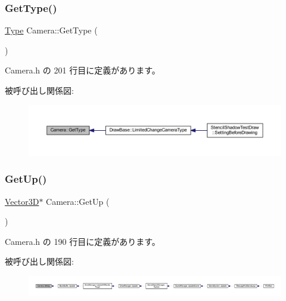 \subsubsection{\texorpdfstring{Get\+Type()}{GetType()}}
{\footnotesize\ttfamily \mbox{\hyperlink{class_camera_a3b0a1f58deca679ac665f61c480d1dcb}{Type}} Camera\+::\+Get\+Type (\begin{DoxyParamCaption}{ }\end{DoxyParamCaption})\hspace{0.3cm}{\ttfamily [inline]}}



 Camera.\+h の 201 行目に定義があります。

被呼び出し関係図\+:
\nopagebreak
\begin{figure}[H]
\begin{center}
\leavevmode
\includegraphics[width=350pt]{class_camera_a3bda45b352bfa163c306c638a2aee1f6_icgraph}
\end{center}
\end{figure}
\mbox{\label{class_camera_aa767cb71ea435cee1e42effc912904eb}} 
\subsubsection{\texorpdfstring{Get\+Up()}{GetUp()}}
{\footnotesize\ttfamily \mbox{\hyperlink{class_vector3_d}{Vector3D}}$\ast$ Camera\+::\+Get\+Up (\begin{DoxyParamCaption}{ }\end{DoxyParamCaption})\hspace{0.3cm}{\ttfamily [inline]}}



 Camera.\+h の 190 行目に定義があります。

被呼び出し関係図\+:
\nopagebreak
\begin{figure}[H]
\begin{center}
\leavevmode
\includegraphics[width=350pt]{class_camera_aa767cb71ea435cee1e42effc912904eb_icgraph}
\end{center}
\end{figure}
\mbox{\label{class_camera_aa472374f61480c5a9dff89d30be029f4}} 
